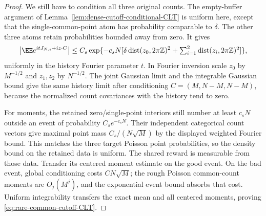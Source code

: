 \documentclass[11pt,letterpaper]{article}
\begin{document}
\begin{proof}
We still have to condition all three original counts.
The empty-buffer argument of
Lemma~\ref{lem:dense-cutoff-conditional-CLT} is uniform here,
except that the single-common-point atom has probability
comparable to $\delta$. The other three atoms retain
probabilities bounded away from zero. It gives
\[
 \left|\EE e^{itJ_{N,s}+i z\cdot C}\right|
 \le C_s\exp\{-c_sN[
      \delta\operatorname{dist}(z_0,2\pi\mathbb Z)^2
       +\textstyle\sum_{i=1}^2\operatorname{dist}(z_i,2\pi\mathbb Z)^2]\},
\]
uniformly in the history Fourier parameter $t$.
In Fourier inversion scale $z_0$ by $M^{-1/2}$ and
$z_1,z_2$ by $N^{-1/2}$. The joint Gaussian limit and
the integrable Gaussian bound give the same history limit
after conditioning $C=(M,N-M,N-M)$, because the normalized
count covariances with the history tend to zero.

For moments, the retained zero/single-point interiors still
number at least $c_sN$ outside an event of probability
$C_se^{-c_sN}$. Their independent categorical count vectors
give maximal point mass $C_s/(N\sqrt M)$ by the displayed
weighted Fourier bound. This matches the three target Poisson
point probabilities, so the density bound on the retained
data is uniform. The shared reward is measurable from those
data. Transfer its centered moment estimate on the good event.
On the bad event, global conditioning costs $CN\sqrt M$;
the rough Poisson common-count moments are $O_j(M^j)$,
and the exponential event bound absorbs that cost.
Uniform integrability transfers the exact mean and all
centered moments, proving \eqref{eq:rare-common-cutoff-CLT}.
\end{proof}
\end{document}
